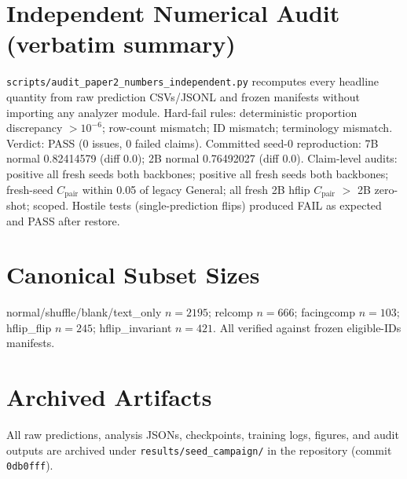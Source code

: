 \documentclass[10pt,twocolumn,letterpaper]{article}
\begin{document}
\section{Independent Numerical Audit (verbatim summary)}
\texttt{scripts/audit\_paper2\_numbers\_independent.py} recomputes every
headline quantity from raw prediction CSVs/JSONL and frozen manifests
without importing any analyzer module. Hard-fail rules: deterministic
proportion discrepancy $> 10^{-6}$; row-count mismatch; ID mismatch;
terminology mismatch. Verdict: PASS (0 issues, 0 failed claims).
Committed seed-0 reproduction: 7B normal 0.82414579 (diff 0.0);
2B normal 0.76492027 (diff 0.0). Claim-level audits: \dA{} positive all
fresh seeds both backbones; \dG{} positive all fresh seeds both backbones;
fresh-seed $C_{\text{pair}}$ within 0.05 of legacy General; all fresh 2B
hflip $C_{\text{pair}}$ $>$ 2B zero-shot; \qwennew{} scoped. Hostile tests
(single-prediction flips) produced FAIL as expected and PASS after restore.

\section{Canonical Subset Sizes}
normal/shuffle/blank/text\_only $n{=}2195$; relcomp $n{=}666$;
facingcomp $n{=}103$; hflip\_flip $n{=}245$; hflip\_invariant $n{=}421$.
All verified against frozen eligible-IDs manifests.

\section{Archived Artifacts}
All raw predictions, analysis JSONs, checkpoints, training logs, figures,
and audit outputs are archived under \texttt{results/seed\_campaign/} in
the repository (commit \texttt{0db0fff}).
\end{document}
